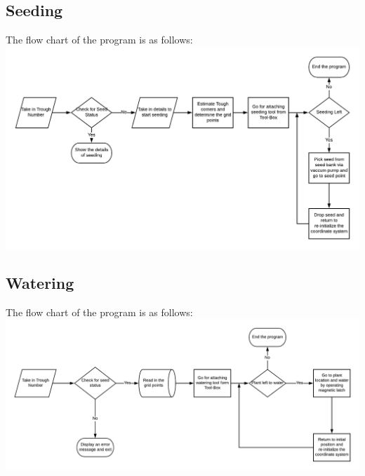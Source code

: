 \documentclass[a4paper,12pt,oneside]{book}
\begin{document}
\subsection*{Seeding}
\begin{center}
    \item The flow chart of the program is as follows:
    \includegraphics[scale=0.5]{seeding_for_document.png}    
\end{center}
\subsection*{Watering}
\begin{center}
    \item The flow chart of the program is as follows:
    \includegraphics[scale=0.5]{water_for_document.png}    
\end{center}
\end{document}
